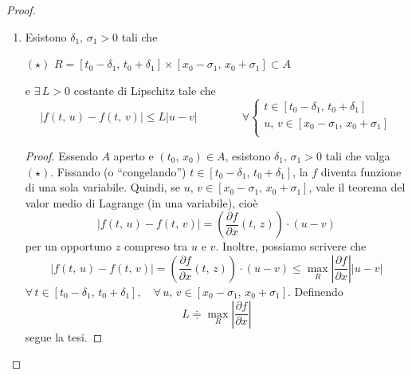 \begin{proof}
\begin{enumerate}[labelindent=\parindent,leftmargin=*,label=\textnormal{\underline{Passo \arabic*}.},start=1]
\begin{proof}
$$\begin{array}{ccc}
	\rotatebox{270}{$=$} & & \\
	x(t) - x(t_0) & & \\
	\qquad \rotatebox{270}{$\overset{\rotatebox{90}{\tiny $\mathrm{(CI)}$}}{=}$} & & \\
	x(t) - x_0\\
	\end{array}
	$$
	cioè
	$$
	x(t) = x_0 + \int_{t_0}^t f(s,\,x(s)) \mathrm{d}s
	$$
	$(\Uparrow)$ Sia $x \in C^0([t_0-\delta,\,t_0+\delta])$ e supponiamo che
	$$
	G_x \subseteq A
	$$
	e
	$$
	x(t) = x_0 + \int_{t_0}^t f(s,\,x(s))\mathrm{d}s \qquad \forall t \in [t_0-\delta,\,t_0+\delta]
	$$
	La proprietà $G_x \subseteq A$, dunque, è gratis. Anche la $\mathrm{(CI)}$ è banale, poiché sostituendo $t_0$ a $t$, otteniamo
	$$
	\underline{x(t_0)} = x_0 + \cancelto{_0}{\int_{t_0}^{t_0} f(s,\,x(s))\mathrm{d}s} = \underline{x_0}
	$$
	Osserviamo che la funzione
	$$
	[t_0-\delta,\,t_0+\delta] \ni s \longmapsto f(s,\,x(s))
	$$
	è continua (perché composizione di funzioni continue). Per il teorema fondamentale del calcolo, quindi,
	$$
	x \in C^1([t_0-\delta,\,t_0+\delta]) \qquad \text{e vale } \mathrm{(E)}
	$$
	\end{proof}
	
	
	\item Esistono $\delta_1,\,\sigma_1 > 0$ tali che
	\begin{center}
	$\mathrm{(\star)}$
	\hfill
	$\displaystyle
	R = [t_0-\delta_1,\,t_0+\delta_1] \times [x_0-\sigma_1,\,x_0+\sigma_1] \subset A
	$
	\hfill \null \\
	\end{center}
	e $\exists \, L > 0$ costante di Lipschitz tale che
	$$
	|f(t,\,u) - f(t,\,v)| \leq L|u-v| \qquad\qquad \forall
	\begin{cases}
	t \in [t_0-\delta_1,\,t_0+\delta_1]\\
	u,\,v \in [x_0-\sigma_1,\,x_0+\sigma_1]\\
	\end{cases}
	$$
	\begin{proof}
	Essendo $A$ aperto e $(t_0,\,x_0) \in A$, esistono $\delta_1,\,\sigma_1 > 0$ tali che valga $\mathrm{(\star)}$. Fissando (o ``congelando'') $t \in [t_0-\delta_1,\,t_0+\delta_1]$, la $f$ diventa funzione di una sola variabile. Quindi, se $u,\,v \in [x_0-\sigma_1,\,x_0+\sigma_1]$, vale il teorema del valor medio di Lagrange (in una variabile), cioè
	$$
	|f(t,\,u) - f(t,\,v)| = \left(\dfrac{\partial f}{\partial x}(t,\,z)\right) \cdot (u-v)
	$$
	per un opportuno $z$ compreso tra $u$ e $v$. Inoltre, possiamo scrivere che
	$$
	|f(t,\,u) - f(t,\,v)| = \left(\dfrac{\partial f}{\partial x}(t,\,z)\right) \cdot (u-v) \leq
	\underset{R}{\max}\left| \dfrac{\partial f}{\partial x} \right||u-v|
	$$
	$\forall \, t \in [t_0-\delta_1,\,t_0+\delta_1], \quad \forall \, u,\,v \in [x_0-\sigma_1,\,x_0+\sigma_1]$. Definendo
	$$
	L \doteqdot \underset{R}{\max}\left| \dfrac{\partial f}{\partial x} \right|
	$$
	segue la tesi.
	\end{proof}
	

\end{enumerate}
\end{proof}
